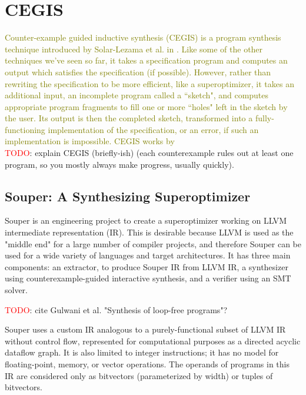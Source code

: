 \documentclass[12pt,twoside]{reedthesis}
\newcommand{\red}[1]{\textcolor{red}{#1}}
\newcommand{\green}[1]{\textcolor{olive}{#1}}
\begin{document}
    \section{CEGIS}
        \green{
        Counter-example guided inductive synthesis (CEGIS) is a program synthesis technique introduced by Solar-Lezama et al. in \cite{solar-lezama2006sketch}.
        Like some of the other techniques we've seen so far, it takes a specification program and computes an output which satisfies the specification (if possible).
        However, rather than rewriting the specification to be more efficient, like a superoptimizer, it takes an additional input, an incomplete program called a ``sketch", and computes appropriate program fragments to fill one or more ``holes" left in the sketch by the user.
        Its output is then the completed sketch, transformed into a fully-functioning implementation of the specification, or an error, if such an implementation is impossible.
        CEGIS works by 
        }
        \\  \red{TODO}: explain CEGIS (briefly-ish) (each counterexample rules out at least one program, so you mostly always make progress, usually quickly).

        \subsection{Souper: A Synthesizing Superoptimizer}
            Souper \cite{sasnauskas2017souper} is an engineering project to create a superoptimizer working on LLVM intermediate representation (IR).
            This is desirable because LLVM is used as the "middle end" for a large number of compiler projects, and therefore Souper can be used for a wide variety of languages and target architectures.
            It has three main components:
                an extractor, to produce Souper IR from LLVM IR,
                a synthesizer using counterexample-guided interactive synthesis,
                and a verifier using an SMT solver.
            
            \red{TODO}: cite Gulwani et al. "Synthesis of loop-free programs"?
            
            Souper uses a custom IR analogous to a purely-functional subset of LLVM IR without control flow\footnotemark, represented for computational purposes as a directed acyclic dataflow graph.
            It is also limited to integer instructions; it has no model for floating-point, memory, or vector operations.
            The operands of programs in this IR are considered only as bitvectors (parameterized by width) or tuples of bitvectors.
            
\end{document}
